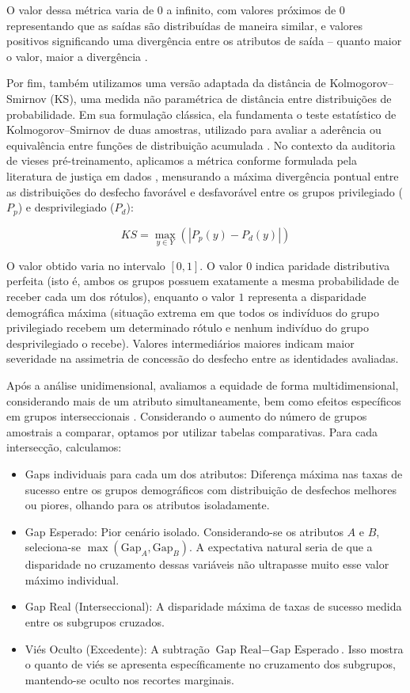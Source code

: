 O valor dessa métrica varia de 0 a infinito, com valores próximos de 0 representando que as saídas são distribuídas de maneira similar, e valores positivos significando uma divergência entre os atributos de saída -- quanto maior o valor, maior a divergência \cite{kullback1951information, hardt2021sagemaker}.

Por fim, também utilizamos uma versão adaptada da distância de Kolmogorov--Smirnov (KS), uma medida não paramétrica de distância entre distribuições de probabilidade. Em sua formulação clássica, ela fundamenta o teste estatístico de Kolmogorov--Smirnov de duas amostras, utilizado para avaliar a aderência ou equivalência entre funções de distribuição acumulada \cite{smirnov1948table}. No contexto da auditoria de vieses pré-treinamento, aplicamos a métrica conforme formulada pela literatura de justiça em dados \cite{hardt2021sagemaker}, mensurando a máxima divergência pontual entre as distribuições do desfecho favorável e desfavorável entre os grupos privilegiado ($P_p$) e desprivilegiado ($P_d$):

\begin{equation} KS = \max_{y \in Y} \left( | P_p(y) - P_d(y) | \right) \end{equation}

O valor obtido varia no intervalo $[0, 1]$. O valor $0$ indica paridade distributiva perfeita (isto é, ambos os grupos possuem exatamente a mesma probabilidade de receber cada um dos rótulos), enquanto o valor $1$ representa a disparidade demográfica máxima (situação extrema em que todos os indivíduos do grupo privilegiado recebem um determinado rótulo e nenhum indivíduo do grupo desprivilegiado o recebe). Valores intermediários maiores indicam maior severidade na assimetria de concessão do desfecho entre as identidades avaliadas.

Após a análise unidimensional, avaliamos a equidade de forma multidimensional, considerando mais de um atributo simultaneamente, bem como efeitos específicos em grupos interseccionais \cite{kearns2018preventing}. Considerando o aumento do número de grupos amostrais a comparar, optamos por utilizar tabelas comparativas. Para cada intersecção, calculamos:
\begin{itemize}
    \item Gaps individuais para cada um dos atributos: Diferença máxima nas taxas de sucesso entre os grupos demográficos com distribuição de desfechos melhores ou piores, olhando para os atributos isoladamente.
    \item Gap Esperado: Pior cenário isolado. Considerando-se os atributos $A$ e $B$, seleciona-se $\max(\text{Gap}_A, \text{Gap}_B)$. A expectativa natural seria de que a disparidade no cruzamento dessas variáveis não ultrapasse muito esse valor máximo individual.
    \item Gap Real (Interseccional): A disparidade máxima de taxas de sucesso medida entre os subgrupos cruzados.
    \item Viés Oculto (Excedente): A subtração $\text{Gap Real} - \text{Gap Esperado}$. Isso mostra o quanto de viés se apresenta específicamente no cruzamento dos subgrupos, mantendo-se oculto nos recortes marginais.
\end{itemize}

